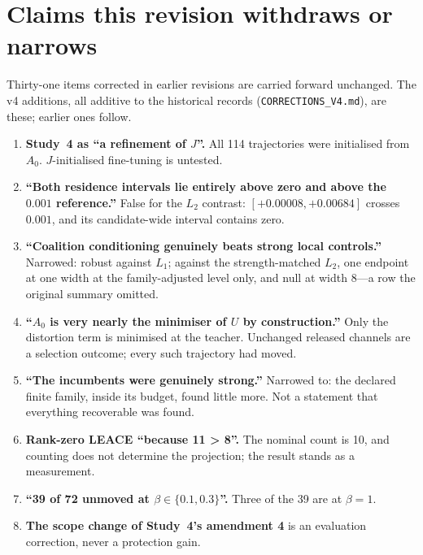 \documentclass[10pt]{article}
\begin{document}
\begin{table}[t]
\centering\scriptsize

\caption{Every load-bearing claim, its status, the measurement behind it, and what it does not
establish. The full traceable list, with source commit, artifact, endpoint, data pool and uncertainty
procedure for each, is \texttt{CLAIM\_LEDGER.csv}.}
\label{tab:claimsupport}
\end{table}

\section{Claims this revision withdraws or narrows}
\label{sec:withdrawn}

Thirty-one items corrected in earlier revisions are carried forward unchanged. The v4 additions, all
additive to the historical records (\texttt{CORRECTIONS\_V4.md}), are these; earlier ones follow.

\begin{enumerate}\itemsep1pt
\item \textbf{Study~4 as ``a refinement of $J$''.} All 114 trajectories were initialised from $A_0$.
$J$-initialised fine-tuning is untested.
\item \textbf{``Both residence intervals lie entirely above zero and above the $0.001$ reference.''} False for
the $L_2$ contrast: $[+0.00008,+0.00684]$ crosses $0.001$, and its candidate-wide interval contains zero.
\item \textbf{``Coalition conditioning genuinely beats strong local controls.''} Narrowed: robust against
$L_1$; against the strength-matched $L_2$, one endpoint at one width at the family-adjusted level only,
and null at width 8---a row the original summary omitted.
\item \textbf{``$A_0$ is very nearly the minimiser of $U$ by construction.''} Only the distortion term is
minimised at the teacher. Unchanged released channels are a selection outcome; every such trajectory had
moved.
\item \textbf{``The incumbents were genuinely strong.''} Narrowed to: the declared finite family, inside its
budget, found little more. Not a statement that everything recoverable was found.
\item \textbf{Rank-zero LEACE ``because 11 > 8''.} The nominal count is 10, and counting does not determine
the projection; the result stands as a measurement.
\item \textbf{``39 of 72 unmoved at $\beta\in\{0.1,0.3\}$''.} Three of the 39 are at $\beta=1$.
\item \textbf{The scope change of Study~4's amendment 4} is an evaluation correction, never a protection gain.
\end{enumerate}
\end{document}
